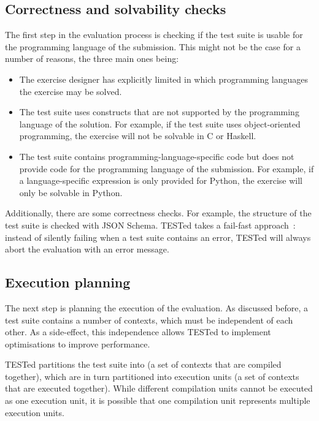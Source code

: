 \documentclass[../main]{subfiles}
\begin{document}
\subsection{Correctness and solvability checks}\label{subsec:solvability-and-correctness-checks}

The first step in the evaluation process is checking if the test suite is usable for the programming language of the submission.
This might not be the case for a number of reasons, the three main ones being:

\begin{itemize}
    \item The exercise designer has explicitly limited in which programming languages the exercise may be solved.
    \item The test suite uses constructs that are not supported by the programming language of the solution.
          For example, if the test suite uses object-oriented programming, the exercise will not be solvable in C or Haskell.
    \item The test suite contains programming-language-specific code but does not provide code for the programming language of the submission.
          For example, if a language-specific expression is only provided for Python, the exercise will only be solvable in Python.
\end{itemize}

Additionally, there are some correctness checks.
For example, the structure of the test suite is checked with JSON Schema.
TESTed takes a fail-fast approach~\autocite{shoreFailFastSoftware2004}: instead of silently failing when a test suite contains an error, TESTed will always abort the evaluation with an error message.

\subsection{Execution planning}\label{subsec:execution-planning}

The next step is planning the execution of the evaluation.
As discussed before, a test suite contains a number of contexts, which must be independent of each other.
As a side-effect, this independence allows TESTed to implement optimisations to improve performance.

TESTed partitions the test suite into  (a set of contexts that are compiled together), which are in turn partitioned into execution units (a set of contexts that are executed together).
While different compilation units cannot be executed as one execution unit, it is possible that one compilation unit represents multiple execution units.
\end{document}
